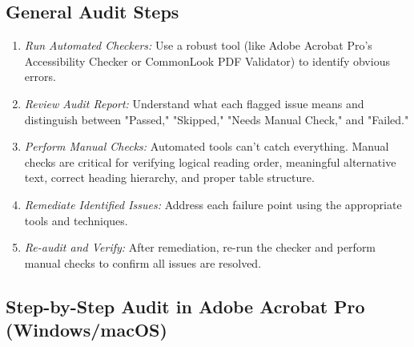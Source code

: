 \subsection{General Audit Steps}
\label{subsec:general-audit-steps}

\begin{enumerate}
\item \emph{Run Automated Checkers:} Use a robust tool (like Adobe Acrobat Pro's Accessibility Checker or CommonLook PDF Validator) to identify obvious errors.
\item \emph{Review Audit Report:} Understand what each flagged issue means and distinguish between "Passed," "Skipped," "Needs Manual Check," and "Failed."
\item \emph{Perform Manual Checks:} Automated tools can't catch everything. Manual checks are critical for verifying logical reading order, meaningful alternative text, correct heading hierarchy, and proper table structure.
\item \emph{Remediate Identified Issues:} Address each failure point using the appropriate tools and techniques.
\item \emph{Re-audit and Verify:} After remediation, re-run the checker and perform manual checks to confirm all issues are resolved.
\end{enumerate}

\subsection{Step-by-Step Audit in Adobe Acrobat Pro (Windows/macOS)}
\label{subsec:step-by-step-acrobat}


